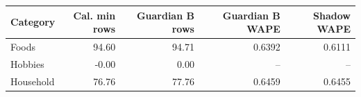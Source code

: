 \begin{tabular}{lrrrr}
\toprule
Category & Cal. min rows & Guardian B rows & Guardian B WAPE & Shadow WAPE \\
\midrule
Foods & 94.60 & 94.71 & 0.6392 & 0.6111 \\
Hobbies & -0.00 & 0.00 & -- & -- \\
Household & 76.76 & 77.76 & 0.6459 & 0.6455 \\
\bottomrule
\end{tabular}
